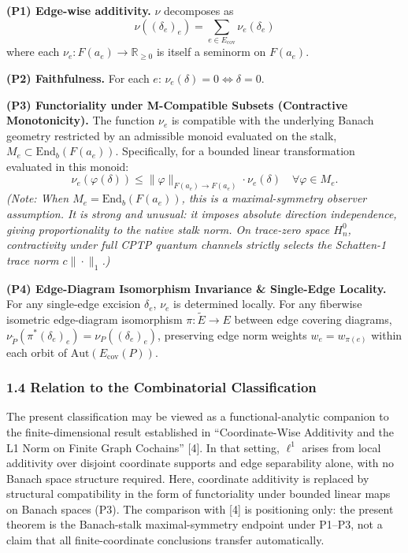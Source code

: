\documentclass[
  11pt,
]{article}
\begin{document}
\textbf{(P1) Edge-wise additivity.} \(\nu\) decomposes as
\[\nu((\delta_e)_e) = \sum_{e \in E_{\text{cov}}} \nu_e(\delta_e)\]
where each \(\nu_e: F(a_e) \to \mathbb{R}_{\geq 0}\) is itself a seminorm on \(F(a_e)\).

\textbf{(P2) Faithfulness.} For each \(e\): \(\nu_e(\delta) = 0 \iff \delta = 0\).

\textbf{(P3) Functoriality under M-Compatible Subsets (Contractive Monotonicity).} The function \(\nu_e\) is compatible with the underlying Banach geometry restricted by an admissible monoid evaluated on the stalk, \(M_e \subset \mathrm{End}_b(F(a_e))\). Specifically, for a bounded linear transformation evaluated in this monoid:
\[\nu_e(\varphi(\delta)) \leq \|\varphi\|_{F(a_e)\to F(a_e)} \cdot \nu_e(\delta) \quad \forall \varphi \in M_e.\]
\emph{(Note: When \(M_e = \mathrm{End}_b(F(a_e))\), this is a maximal-symmetry observer assumption. It is strong and unusual: it imposes absolute direction independence, giving proportionality to the native stalk norm. On trace-zero space \(H_n^0\), contractivity under full CPTP quantum channels strictly selects the Schatten-1 trace norm \(c \|\cdot\|_1\).)}

\textbf{(P4) Edge-Diagram Isomorphism Invariance \& Single-Edge Locality.} For any single-edge excision \(\delta_e\), \(\nu_e\) is determined locally. For any fiberwise isometric edge-diagram isomorphism \(\pi: \tilde{E} \to E\) between edge covering diagrams, \(\nu_{\tilde{P}}(\pi^*(\delta_e)_e) = \nu_P((\delta_e)_e)\), preserving edge norm weights \(w_e = w_{\pi(e)}\) within each orbit of \(\text{Aut}(E_{\text{cov}}(P))\).

\subsubsection{1.4 Relation to the Combinatorial Classification}\label{relation-to-the-combinatorial-classification}

The present classification may be viewed as a functional-analytic companion to the finite-dimensional result established in ``Coordinate-Wise Additivity and the L1 Norm on Finite Graph Cochains'' {[}4{]}. In that setting, \(\ell^1\) arises from local additivity over disjoint coordinate supports and edge separability alone, with no Banach space structure required. Here, coordinate additivity is replaced by structural compatibility in the form of functoriality under bounded linear maps on Banach spaces (P3). The comparison with {[}4{]} is positioning only: the present theorem is the Banach-stalk maximal-symmetry endpoint under P1--P3, not a claim that all finite-coordinate conclusions transfer automatically.
\end{document}
